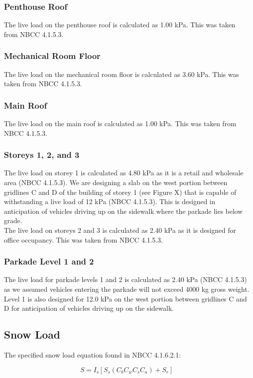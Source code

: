 \documentclass[12pt]{article}
\begin{document}
\subsubsection{Penthouse Roof}
The live load on the penthouse roof is calculated as 1.00 kPa.
This was taken from NBCC 4.1.5.3.
\subsubsection{Mechanical Room Floor}
The live load on the mechanical room floor is calculated as 3.60 kPa.
This was taken from NBCC 4.1.5.3.
\subsubsection{Main Roof}
The live load on the main roof is calculated as 1.00 kPa.
This was taken from NBCC 4.1.5.3.
\subsubsection{Storeys 1, 2, and 3}
The live load on storey 1 is calculated as 4.80 kPa as it is a retail and wholesale area (NBCC 4.1.5.3).
We are designing a slab on the west portion between gridlines C and D of the building of storey 1 (see Figure X) that is capable of withstanding a live load of 12 kPa (NBCC 4.1.5.3). This is designed in anticipation of vehicles driving up on the sidewalk where the parkade lies below grade.\\

The live load on storeys 2 and 3 is calculated as 2.40 kPa as it is designed for office occupancy. This was taken from NBCC 4.1.5.3.
\subsubsection{Parkade Level 1 and 2}
The live load for parkade levels 1 and 2 is calculated as 2.40 kPa (NBCC 4.1.5.3)  as we assumed vehicles entering the parkade will not exceed 4000 kg gross weight.
Level 1 is also designed for 12.0 kPa on the west portion between gridlines C and D for anticipation of vehicles driving up on the sidewalk.
\subsection{Snow Load}
The specified snow load equation found in NBCC 4.1.6.2.1:

\begin{equation*}
    S = I_{s}[S_{s}(C_{b}C_{w}C_{s}C_{a})+S_{r}]
\end{equation*}
\end{document}
